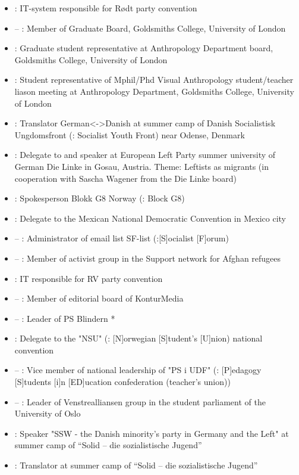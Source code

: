 \begin{itemize}
\item {}: IT-system responsible for Rødt party convention
\item {} –  : Member of Graduate Board, Goldsmiths College, University of London
\item {}: Graduate student representative at Anthropology Department board, Goldsmiths College, University of London
\item {}: Student representative of Mphil/Phd Visual Anthropology student/teacher liason meeting at Anthropology Department, Goldsmiths College, University of London
\item {}: Translator German<->Danish at summer camp of Danish Socialistisk Ungdomsfront (\english: Socialist Youth Front) near Odense, Denmark
\item {}: Delegate to and speaker at European Left Party summer university of German Die Linke in Gosau, Austria. Theme: Leftists as migrants (in cooperation with Sascha Wagener from the Die Linke board)
\item {}: Spokesperson Blokk G8 Norway (\english: Block G8)
\item {}: Delegate to the Mexican National Democratic Convention in Mexico city
\item {} – : Administrator of email list SF-list (\english:[S]ocialist [F]orum)
\item {} – : Member of activist group in the Support network for Afghan refugees
\item {}: IT responsible for RV party convention
\item {} – : Member of editorial board of KonturMedia
\item {} – : Leader of PS Blindern *
\item {}: Delegate to the "NSU" (\english: [N]orwegian [S]tudent's [U]nion) national convention
\item {} – : Vice member of national leadership of "PS i UDF" (\english: [P]edagogy [S]tudents [i]n [ED]ucation confederation (teacher's union))
\item {} – : Leader of Venstrealliansen group in the student parliament of the University of Oslo
\item {}: Speaker "SSW - the Danish minority's party in Germany and the Left" at summer camp of “Solid – die sozialistische Jugend”
\item {}: Translator at summer camp of “Solid – die sozialistische Jugend”

\end{itemize}
